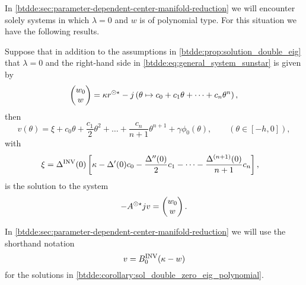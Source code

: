 In \cref{btdde:sec:parameter-dependent-center-manifold-reduction} we will encounter
solely systems in which $\lambda=0$ and $w$ is of polynomial type. For this
situation we have the following results.

\begin{corollary}
\label{btdde:corollary:sol_double_zero_eig_polynomial} 
Suppose that in addition to the assumptions in \cref{btdde:prop:solution_double_eig} that $\lambda = 0$ and the right-hand side in \cref{btdde:eq:general_system_sunstar} is given by
\[
\begin{pmatrix}
w_0 \\ w
\end{pmatrix}
=
\kappa r^{\odot\star} - j\left(\theta \mapsto c_0 + c_1 \theta + \dots + c_n \theta^n\right),
\]
then
\[
    v(\theta) = \xi + c_0 \theta + \frac{c_1}2 \theta^2 + \dots + \frac{c_n}{n + 1} \theta^{n + 1} + \gamma \phi_0(\theta), 
                \qquad\left(\theta\in[-h,0]\right),
\]
with
\begin{align*}
    \xi & = \Delta^{\mathrm{INV}}(0)\left[\kappa - \Delta'(0) c_0  - \frac{\Delta''(0)}2 c_1 - \dots - \frac{\Delta^{(n + 1)}(0)}{n + 1} c_n \right],
\end{align*}
is the solution to the system
\[
-A^{\odot\star} j v  = 
\begin{pmatrix}
w_0 \\ w
\end{pmatrix}.
\]
\end{corollary}

\begin{remark}
In \cref{btdde:sec:parameter-dependent-center-manifold-reduction} we will use the shorthand notation
\[
    v = B^{\mathrm{INV}}_{0} (\kappa - w)
\]
for the solutions in \cref{btdde:corollary:sol_double_zero_eig_polynomial}.
\end{remark}

